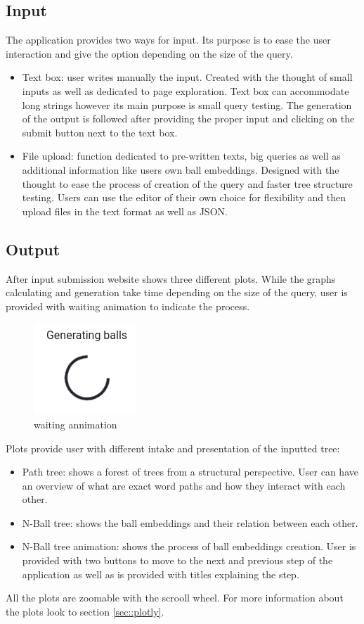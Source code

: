 \subsection{Input}
The application provides two ways for input. Its purpose is to ease the user interaction and give the option depending on the size of the query. 

\begin{itemize}
	\item Text box: user writes manually the input. Created with the thought of small inputs as well as dedicated to page exploration. Text box can accommodate long strings however its main purpose is small query testing. The generation of the output is followed after providing the proper input and clicking on the submit button next to the text box.
	\item  File upload: function dedicated to pre-written texts, big queries as well as additional information like users own ball embeddings. Designed with the thought to ease the process of creation of the query and faster tree structure testing. Users can use the editor of their own choice for flexibility and then upload files in the text format as well as JSON. 
\end{itemize}


\subsection{Output}
After input submission website shows three different plots. While the graphs calculating and generation take time depending on the size of the query, user is provided with waiting animation to indicate the process. 

\begin{figure}[H]
	\centering
	\includegraphics[scale=0.5]{res/waiting.png}
	\caption{waiting annimation}
	\label{fig:waiting}
\end{figure}


Plots provide user with different intake and presentation of the inputted tree:
\begin{itemize}
	\item Path tree: shows a forest of trees from a structural perspective. User can have an overview of what are exact word paths and how they interact with each other.
	\item N-Ball tree: shows the ball embeddings and their relation between each other.
	\item N-Ball tree animation: shows the process of ball embeddings creation. User is provided with two buttons to move to the next and previous step of the application as well as is provided with titles explaining the step.	
\end{itemize}

All the plots are zoomable with the scrooll wheel. 
For more information about the plots look to section \ref{sec::plotly}.

